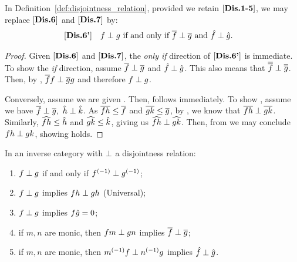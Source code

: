 \begin{lemma}\label{lem:disjointness_equivalent_axioms}
  In Definition~\ref{def:disjointness_relation}, provided we retain $[\text{\bfseries {Dis}.{1-5}}]$, we may
  replace $[\text{\bfseries {Dis}.{6}}]$ and $[\text{\bfseries {Dis}.{7}}]$ by:
  \begin{align*}
    [\text{\bfseries {Dis}.{6'}}]\quad &f\perp g\text{ if and only if }\overline{f} \perp \overline{g}
      \text{ and }\hat{f}\perp\hat{g}.
  \end{align*}
\end{lemma}
\begin{proof}
  Given $[\text{\bfseries {Dis}.{6}}]$ and $[\text{\bfseries {Dis}.{7}}]$, the \emph{only if} direction of $[\text{\bfseries {Dis}.{6'}}]$ is
  immediate. To show the \emph{if} direction, assume $\overline{f} \perp \overline{g}$ and
  $\hat{f}\perp\hat{g}$. This also means that $\overline{\overline{f}} \perp \overline{\overline{g}}$. Then, by
  , $\overline{f} f \perp \overline{g}g$ and therefore $f \perp g$.

  Conversely, assume we are given . Then,  follows immediately. To show
  , assume we have $\rst{f}\cdperp \rst{g},\ \rg{h}\cdperp \rg{k}$. As
  $\overline{f h} \le \overline{f}$ and $\overline{g k}\le\overline{g}$, by , we know that
  $\overline{f h} \perp \overline{g k}$. Similarly, $\widehat{f h} \le \hat{h}$ and $\widehat{g k} \le \hat{k}$,
  giving us $\widehat{f h}\perp \widehat{g k}$. Then, from  we may conclude
  $f h \perp g k$, showing  holds.
\end{proof}
\begin{lemma}\label{lem:disjointness_various}
  In an inverse category \X with $\perp$ a disjointness relation:
  \begin{enumerate}[{(}i{)}]
    \item $f \perp g$ if and only if ${f}^{(-1)}\perp {g}^{(-1)}$; \label{lemitem:djv_inverses}
    \item $f \perp g$ implies $f h \perp g h$ (Universal);\label{lemitem:djv_universal}
    \item $f \perp g$ implies $f\hat{g} = 0$;
    \item if $m,n$ are monic, then $f m \perp g n$ implies $\overline{f} \perp \overline{g}$;
      \label{lemitem:djv_monic_implies}
    \item if $m,n$ are monic, then ${m}^{(-1)} f \perp {n}^{(-1)}g$ implies $\hat{f} \perp \hat{g}$.
  \end{enumerate}
\end{lemma}
